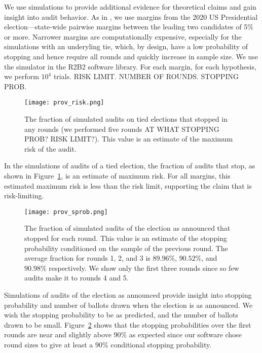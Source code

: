 We use simulations to provide additional evidence for theoretical claims and gain insight into audit behavior. As in \cite{simulations}, we use margins from the 2020 US Presidential election---state-wide pairwise margins between the leading two candidates of 5\% or more. Narrower margins are computationally expensive, especially for the simulations with an underyling tie, which, by design, have a low probability of stopping and hence require all rounds and quickly increase in sample size. We use the simulator in the R2B2 software library\cite{r2b2}. For each margin, for each hypothesis, we perform $10^4$ trials. RISK LIMIT. NUMBER OF ROUNDS. STOPPING PROB. 

\begin{figure}
\texttt{[image: prov\_risk.png]}
\caption{The fraction of simulated \Providence audits on tied elections that stopped in any rounds (we performed five rounds AT WHAT STOPPING PROB? RISK LIMIT?). This value is an estimate of the maximum risk of the \Providence audit.}
\label{fig:prov-risk}
\end{figure}

In the simulations of \Providence audits of a tied election, the fraction of audits that stop, as shown in Figure~\ref{fig:prov-risk}, is an estimate of maximum risk. For all margins, this estimated maximum risk is less than the risk limit, supporting the claim that \Providence is risk-limiting.

\begin{figure}
\texttt{[image: prov\_sprob.png]}
\caption{The fraction of simulated \Providence audits of the election as announced that stopped for each round. This value is an estimate of the stopping probability conditioned on the sample of the previous round. The average fraction for rounds 1, 2, and 3 is $89.96\%$, $90.52\%$, and $90.98\%$ respectively. We show only the first three rounds since so few audits make it to rounds 4 and 5.}
\label{fig:prov-sprob}
\end{figure}

Simulations of audits of the election as announced provide insight into stopping probability and number of ballots drawn when the election is as announced. We wish the stopping probability to be as predicted, and the number of ballots drawn to be small. Figure~\ref{fig:prov-sprob} shows that the stopping probabilities over the first rounds are near and slightly above $90\%$ as expected since our software chose round sizes to give at least a $90\%$ conditional stopping probability.

